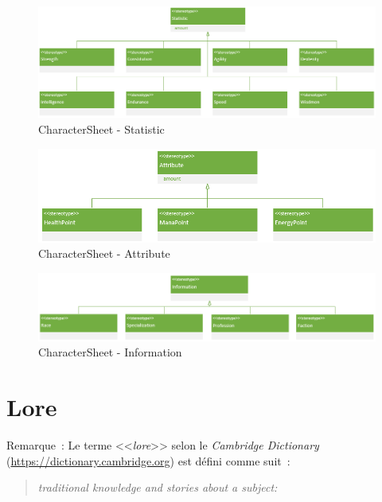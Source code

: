 \begin{figure}[H]
    \begin{center}
    \includegraphics[width=\linewidth]{10_img/Z_annexeA/cs_statistic.PNG}
    \caption{CharacterSheet - Statistic}
    \label{A-Statistic}
    \end{center}
\end{figure}


\begin{figure}[H]
    \begin{center}
    \includegraphics[width=14cm]{10_img/Z_annexeA/cs_attribute.PNG}
    \caption{CharacterSheet - Attribute}
    \label{A-Attribute}
    \end{center}
\end{figure}

\begin{figure}[H]
    \begin{center}
    \includegraphics[width=15cm]{10_img/Z_annexeA/cs_information.PNG}
    \caption{CharacterSheet - Information}
    \label{A-Information}
    \end{center}
\end{figure}


\section{Lore}

Remarque~: Le terme <<\emph{lore}>> selon le \emph{Cambridge
Dictionary} (\url{https://dictionary.cambridge.org}) est d\'efini comme suit~:
\begin{quote}
\em traditional knowledge and stories about a subject: 
\end{quote}
 
